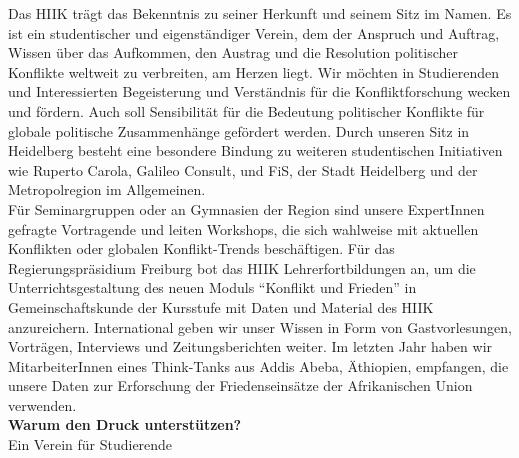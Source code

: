 {    Das HIIK trägt das Bekenntnis zu seiner Herkunft und seinem Sitz im Namen. Es ist ein studentischer und eigenständiger Verein, dem der Anspruch und Auftrag, Wissen über das Aufkommen, den Austrag und die Resolution politischer Konflikte weltweit zu verbreiten, am Herzen liegt. Wir möchten in Studierenden und Interessierten Begeisterung und Verständnis für die Konfliktforschung wecken und fördern. Auch soll Sensibilität für die Bedeutung politischer Konflikte für globale politische Zusammenhänge gefördert werden. Durch unseren Sitz in Heidelberg besteht eine besondere Bindung zu weiteren studentischen Initiativen wie Ruperto Carola, Galileo Consult, und FiS, der Stadt Heidelberg und der Metropolregion im Allgemeinen.\\
    Für Seminargruppen oder an Gymnasien der Region sind unsere ExpertInnen gefragte Vortragende und leiten Workshops, die sich wahlweise mit aktuellen Konflikten oder globalen Konflikt-Trends beschäftigen. Für das Regierungspräsidium Freiburg bot das HIIK Lehrerfortbildungen an, um die Unterrichtsgestaltung des neuen Moduls “Konflikt und Frieden” in Gemeinschaftskunde der Kursstufe mit Daten und Material des HIIK anzureichern. International geben wir unser Wissen in Form von Gastvorlesungen, Vorträgen, Interviews und Zeitungsberichten weiter. Im letzten Jahr haben wir MitarbeiterInnen eines Think-Tanks aus Addis Abeba, Äthiopien, empfangen, die unsere Daten zur Erforschung der Friedenseinsätze der Afrikanischen Union verwenden.\\[1em]
    \textbf{Warum den Druck unterstützen?}\\
    Ein Verein für Studierende\\
}
